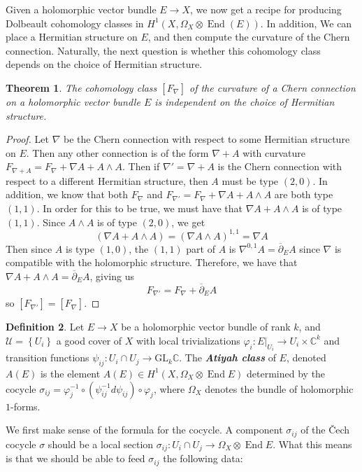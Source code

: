\documentclass[psamsfonts, 12pt]{amsart}
\newtheorem{thm}{Theorem}[section]
\theoremstyle{definition}
\newtheorem{defn}[thm]{Definition}
\theoremstyle{remark}
\newcommand{\ib}[1]{\textbf{\textit{#1}}}
\newcommand{\C}{\mathbb{C}}
\newcommand{\dbar}{\overline{\partial}}
\newcommand{\GL}{\mathrm{GL}}
\newcommand{\inv}{^{-1}}
\newcommand{\set}[1]{\left\lbrace #1 \right\rbrace}
\DeclareMathOperator{\End}{End}
\begin{document}
Given a holomorphic vector bundle $E \to X$, we now get a recipe for producing Dolbeault
cohomology classes in $H^1(X, \Omega_X \otimes \End(E))$. In addition, We can
place a Hermitian structure on $E$, and then compute the curvature of the Chern
connection. Naturally, the next question is whether this cohomology class
depends on the choice of Hermitian structure.
%
\begin{thm}
The cohomology class $[F_\nabla]$ of the curvature of a Chern connection on
a holomorphic vector bundle $E$ is independent on the choice of Hermitian structure.
\end{thm}
%
\begin{proof}
Let $\nabla$ be the Chern connection with respect to some Hermitian structure
on $E$. Then any other connection is of the form $\nabla + A$ with curvature
$F_{\nabla + A} = F_\nabla + \nabla A + A \wedge A$. Then if
$\nabla' = \nabla + A$ is the Chern connection with respect to a different Hermitian
structure, then $A$ must be type $(2,0)$. In addition, we know that both
$F_\nabla$ and $F_{\nabla'} = F_\nabla + \nabla A + A \wedge A$ are both type $(1,1)$.
In order for this to be true, we must have that $\nabla A + A \wedge A$ is
of type $(1,1)$. Since $A \wedge A$ is of type $(2,0)$, we get
\[
(\nabla A + A \wedge A) = (\nabla A \wedge A)^{1,1} = \nabla A
\]
Then since $A$ is type $(1,0)$, the $(1,1)$ part of $A$ is $\nabla^{0,1}A = \dbar_E A$
since $\nabla$ is compatible with the holomorphic structure. Therefore,
we have that $\nabla A + A \wedge A = \dbar_E A$, giving us
\[
F_{\nabla'} = F_\nabla + \dbar_E A
\]
so $[F_{\nabla'}] = [F_\nabla]$.
\end{proof}
%
\begin{defn}
Let $E \to X$ be a holomorphic vector bundle of rank $k$, and
$\mathcal{U} = \set{U_i}$ a good cover of $X$ with local trivializations
$\varphi_i : E\vert_{U_i} \to U_i \times \C^k$ and transition functions
$\psi_{ij} : U_i \cap U_j \to \GL_k\C$. The \ib{Atiyah class} of $E$, denoted
$A(E)$ is the element $A(E) \in H^1(X, \Omega_X \otimes \End E)$ determined by
the cocycle $\sigma_{ij} = \varphi_j\inv \circ (\psi_{ij}\inv d\psi_{ij}) \circ \varphi_j$,
where $\Omega_X$ denotes the bundle of holomorphic $1$-forms.
\end{defn}
%
We first make sense of the formula for the cocycle. A component $\sigma_{ij}$ of
the \v{C}ech cocycle $\sigma$ should be a local section
$\sigma_{ij} : U_i \cap U_j \to \Omega_X \otimes \End E$. What this means
is that we should be able to feed $\sigma_{ij}$ the following data:
\end{document}
